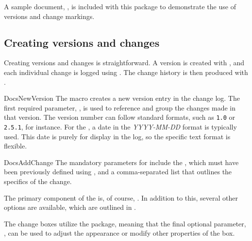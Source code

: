 \documentclass[11pt, outdir = ./out]{article}
\begin{document}
A sample document, , is included with this package to demonstrate the use of versions and change markings.


\subsection{Creating versions and changes}

Creating versions and changes is straightforward. A version is created with , and each individual change is logged using . The change history is then produced with .

\begin{Macrodef}{DocsNewVersion}{}{}
    The  macro creates a new version entry in the change log. The first required parameter, , is used to reference and group the changes made in that version. The version number can follow standard formats, such as \texttt{1.0} or \texttt{2.5.1}, for instance. For the , a date in the \textit{YYYY-MM-DD} format is typically used. This date is purely for display in the log, so the specific text format is flexible.
\end{Macrodef}

\begin{DocsListing}
\end{DocsListing}

\begin{Macrodef}{DocsAddChange}{}{}
    The mandatory parameters for  include the , which must have been previously defined using , and a comma-separated  list that outlines the specifics of the change.

    The primary component of the  is, of course, . In addition to this, several other options are available, which are outlined in .

    The change boxes utilize the  package, meaning that the final optional parameter, , can be used to adjust the appearance or modify other properties of the box.
\end{Macrodef}

\begin{DocsListing}
\end{DocsListing}
\end{document}
